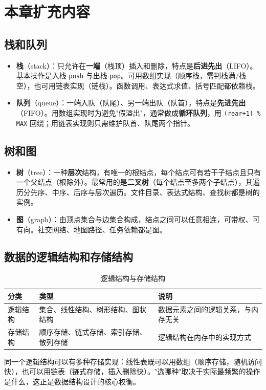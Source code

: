 
\section{本章扩充内容}
\subsection{栈和队列}
\begin{itemize}
  \item \textbf{栈}（stack）：只允许在\textbf{一端}（栈顶）插入和删除，特点是\textbf{后进先出}（LIFO）。基本操作是入栈 \texttt{push} 与出栈 \texttt{pop}。可用数组实现（顺序栈，需判栈满/栈空），也可用链表实现（链栈）。函数调用、表达式求值、括号匹配都依赖栈。
  \item \textbf{队列}（queue）：一端入队（队尾）、另一端出队（队首），特点是\textbf{先进先出}（FIFO）。用数组实现时为避免"假溢出"，通常做成\textbf{循环队列}，用 \texttt{(rear+1) \% MAX} 回绕；用链表实现则只需维护队首、队尾两个指针。
\end{itemize}

\subsection{树和图}
\begin{itemize}
  \item \textbf{树}（tree）：一种\textbf{层次}结构，有唯一的根结点，每个结点可有若干子结点且只有一个父结点（根除外）。最常用的是\textbf{二叉树}（每个结点至多两个子结点），其遍历分先序、中序、后序与层次遍历。文件目录、表达式结构、查找树都是树的实例。
  \item \textbf{图}（graph）：由顶点集合与边集合构成，结点之间可以任意相连，可带权、可有向。社交网络、地图路径、任务依赖都是图。
\end{itemize}

\subsection{数据的逻辑结构和存储结构}
\begin{table}[htbp]
\centering
\caption{逻辑结构与存储结构}
\footnotesize
\begin{tabularx}{\textwidth}{@{}p{2.6cm}p{4.4cm}X@{}}
\toprule
分类 & 类型 & 说明 \\
\midrule
逻辑结构 & 集合、线性结构、树形结构、图状结构 & 数据元素之间的逻辑关系，与内存无关 \\
存储结构 & 顺序存储、链式存储、索引存储、散列存储 & 逻辑结构在内存中的实现方式 \\
\bottomrule
\end{tabularx}
\end{table}
同一个逻辑结构可以有多种存储实现：线性表既可以用数组（顺序存储，随机访问快），也可以用链表（链式存储，插入删除快）。"选哪种"取决于实际最频繁的操作是什么，这正是数据结构设计的核心权衡。


